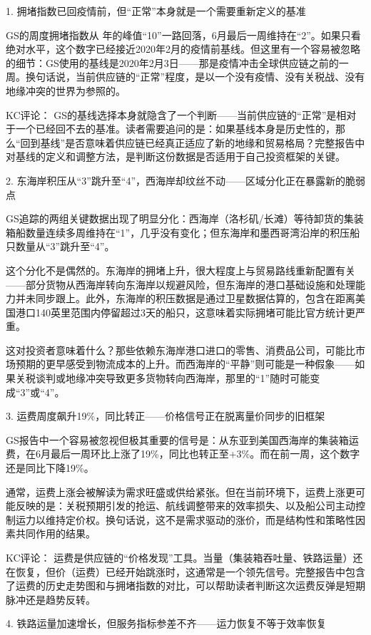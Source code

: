 \documentclass[11pt]{ctexart}
\begin{document}
1. 拥堵指数已回疫情前，但“正常”本身就是一个需要重新定义的基准

GS的周度拥堵指数从 年的峰值“10”一路回落，6月最后一周维持在“2”。如果只看绝对水平，这个数字已经接近2020年2月的疫情前基线。但这里有一个容易被忽略的细节：GS使用的基线是2020年2月3日——那是疫情冲击全球供应链之前的一周。换句话说，当前供应链的“正常”程度，是以一个没有疫情、没有关税战、没有地缘冲突的世界为参照的。

KC评论： GS的基线选择本身就隐含了一个判断——当前供应链的“正常”是相对于一个已经回不去的基准。读者需要追问的是：如果基线本身是历史性的，那么“回到基线”是否意味着供应链已经真正适应了新的地缘和贸易格局？完整报告中对基线的定义和调整方法，是判断这份数据是否适用于自己投资框架的关键。

2. 东海岸积压从“3”跳升至“4”，西海岸却纹丝不动——区域分化正在暴露新的脆弱点

GS追踪的两组关键数据出现了明显分化：西海岸（洛杉矶/长滩）等待卸货的集装箱船数量连续多周维持在“1”，几乎没有变化；但东海岸和墨西哥湾沿岸的积压船只数量从“3”跳升至“4”。

这个分化不是偶然的。东海岸的拥堵上升，很大程度上与贸易路线重新配置有关——部分货物从西海岸转向东海岸以规避风险，但东海岸的港口基础设施和处理能力并未同步跟上。此外，东海岸的积压数据是通过卫星数据估算的，包含在距离美国港口140英里范围内停留超过3天的船只，这意味着实际拥堵可能比官方统计更严重。

这对投资者意味着什么？那些依赖东海岸港口进口的零售、消费品公司，可能比市场预期的更早感受到物流成本的上升。而西海岸的“平静”则可能是一种假象——如果关税谈判或地缘冲突导致更多货物转向西海岸，那里的“1”随时可能变成“3”或“4”。

3. 运费周度飙升19\%，同比转正——价格信号正在脱离量价同步的旧框架

GS报告中一个容易被忽视但极其重要的信号是：从东亚到美国西海岸的集装箱运费，在6月最后一周环比上涨了19\%，同比也转正至+3\%。而在前一周，这个数字还是同比下降19\%。

通常，运费上涨会被解读为需求旺盛或供给紧张。但在当前环境下，运费上涨更可能反映的是：关税预期引发的抢运、航线调整带来的效率损失、以及船公司主动控制运力以维持定价权。换句话说，这不是需求驱动的涨价，而是结构性和策略性因素共同作用的结果。

KC评论： 运费是供应链的“价格发现”工具。当量（集装箱吞吐量、铁路运量）还在恢复，但价（运费）已经开始跳涨时，这通常是一个领先信号。完整报告中包含了运费的历史走势图和与拥堵指数的对比，可以帮助读者判断这次运费反弹是短期脉冲还是趋势反转。

4. 铁路运量加速增长，但服务指标参差不齐——运力恢复不等于效率恢复
\end{document}
